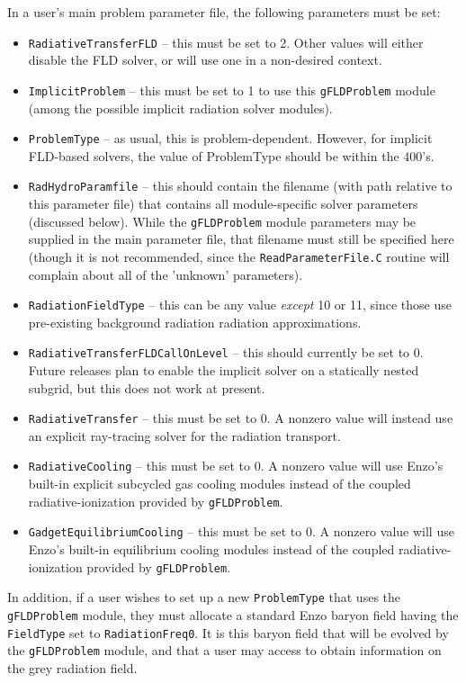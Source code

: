 \documentclass[letterpaper,10pt]{article}
\renewcommand{\(}{\left(}
\renewcommand{\)}{\right)}
\begin{document}
In a user's main problem parameter file, the following parameters
must be set:
\begin{itemize}
\item {\tt RadiativeTransferFLD} -- this must be set to 2.  Other
  values will either disable the FLD solver, or will use one in a
  non-desired context.
\item {\tt ImplicitProblem} -- this must be set to 1 to use this
  {\tt gFLDProblem} module (among the possible implicit radiation solver
  modules).
\item {\tt ProblemType} -- as usual, this is problem-dependent.
  However, for implicit FLD-based solvers, the value of ProblemType
  should be within the 400's.
\item {\tt RadHydroParamfile} -- this should contain the filename
  (with path relative to this parameter file) that contains all
  module-specific solver parameters (discussed below).  While the 
  {\tt gFLDProblem} module parameters may be supplied in the main
  parameter file, that filename must still be specified here (though
  it is not recommended, since the {\tt ReadParameterFile.C} routine
  will complain about all of the 'unknown' parameters). 
\item {\tt RadiationFieldType} -- this can be any value {\em except}
  10 or 11, since those use pre-existing background radiation
  radiation approximations.
\item {\tt RadiativeTransferFLDCallOnLevel} -- this should currently
  be set to 0.  Future releases plan to enable the implicit solver on
  a statically nested subgrid, but this does not work at present.
\item {\tt RadiativeTransfer} -- this must be set to 0.  A nonzero
  value will instead use an explicit ray-tracing solver for the
  radiation transport. 
\item {\tt RadiativeCooling} -- this must be set to 0.  A nonzero
  value will use Enzo's built-in explicit subcycled gas cooling
  modules instead of the coupled radiative-ionization provided by 
  {\tt gFLDProblem}. 
\item {\tt GadgetEquilibriumCooling} -- this must be set to 0.  A
  nonzero value will use Enzo's built-in equilibrium cooling
  modules instead of the coupled radiative-ionization provided by 
  {\tt gFLDProblem}. 
\end{itemize}

In addition, if a user wishes to set up a new {\tt ProblemType} that
uses the {\tt gFLDProblem} module, they must allocate a standard Enzo
baryon field having the {\tt FieldType} set to {\tt RadiationFreq0}.
It is this baryon field that will be evolved by the {\tt gFLDProblem}
module, and that a user may access to obtain information on the
grey radiation field. 
\end{document}
